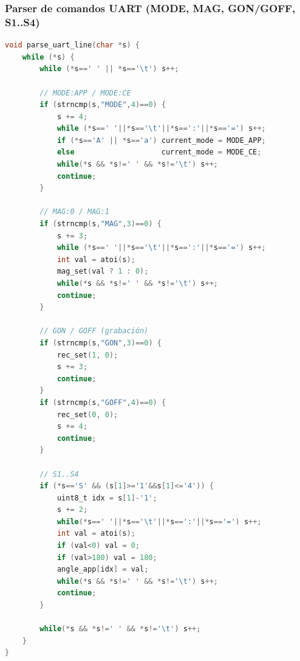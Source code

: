\subsubsection{Parser de comandos UART (MODE, MAG, GON/GOFF, S1..S4)}\label{ap:uart_parser}
\begin{lstlisting}[language=C]
void parse_uart_line(char *s) {
    while (*s) {
        while (*s==' ' || *s=='\t') s++;

        // MODE:APP / MODE:CE
        if (strncmp(s,"MODE",4)==0) {
            s += 4;
            while (*s==' '||*s=='\t'||*s==':'||*s=='=') s++;
            if (*s=='A' || *s=='a') current_mode = MODE_APP;
            else                    current_mode = MODE_CE;
            while(*s && *s!=' ' && *s!='\t') s++;
            continue;
        }

        // MAG:0 / MAG:1
        if (strncmp(s,"MAG",3)==0) {
            s += 3;
            while (*s==' '||*s=='\t'||*s==':'||*s=='=') s++;
            int val = atoi(s);
            mag_set(val ? 1 : 0);
            while(*s && *s!=' ' && *s!='\t') s++;
            continue;
        }

        // GON / GOFF (grabación)
        if (strncmp(s,"GON",3)==0) {
            rec_set(1, 0);
            s += 3;
            continue;
        }
        if (strncmp(s,"GOFF",4)==0) {
            rec_set(0, 0);
            s += 4;
            continue;
        }

        // S1..S4
        if (*s=='S' && (s[1]>='1'&&s[1]<='4')) {
            uint8_t idx = s[1]-'1';
            s += 2;
            while(*s==' '||*s=='\t'||*s==':'||*s=='=') s++;
            int val = atoi(s);
            if (val<0) val = 0;
            if (val>180) val = 180;
            angle_app[idx] = val;
            while(*s && *s!=' ' && *s!='\t') s++;
            continue;
        }

        while(*s && *s!=' ' && *s!='\t') s++;
    }
}
\end{lstlisting}


